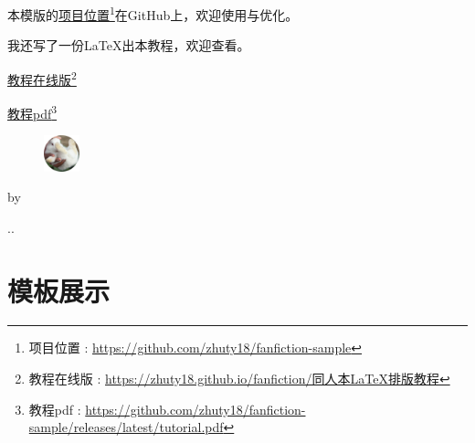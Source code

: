 \documentclass[10pt,openany]{book}
\newcommand{\signature}{
    \vfill
    \setstretch{1.5}

    \begin{figure}[h]
        \hfill\includegraphics[width=2.8em]{headshot.png}\hspace{5.1em}
    \end{figure}

    \vspace{-1.5em}

    \hfill by\bookauthor \hspace{5em}

    \hfill\number\year.\number\month.\number\day\hspace{4.8em}

    \vspace{2cm}
}
\newcommand{\link}[2]{\href{#1}{#2}\footnote{#2 : \href{#1}{#1}}}
\begin{document}
本模版的\link{https://github.com/zhuty18/fanfiction-sample}{项目位置}在GitHub上，欢迎使用与优化。

我还写了一份\LaTeX 出本教程，欢迎查看。

\link{https://zhuty18.github.io/fanfiction/同人本LaTeX排版教程}{教程在线版}

\link{https://github.com/zhuty18/fanfiction-sample/releases/latest/tutorial.pdf}{教程pdf}

\signature

\part{模板展示}




\end{document}
